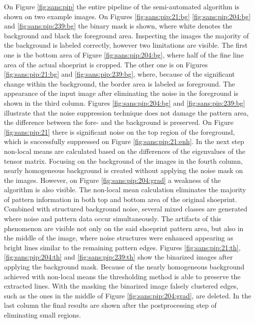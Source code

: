 \documentclass[draft,final]{vutinfth} %
\begin{document}
\par
On Figure \ref{fig:sans:pip} the entire pipeline of the semi-automated algorithm is shown on two example images.
On Figures  \ref{fig:sans:pip:21:bg} \ref{fig:sans:pip:204:bg} and \ref{fig:sans:pip:239:bg} the binary mask is shown, where white denotes the background and black the foreground area.
Inspecting the images the majority of the background is labeled correctly, however two limitations are visible.
The first one is the bottom area of Figure \ref{fig:sans:pip:204:bg}, where half of the fine line area of the actual shoeprint is cropped.
The other one is on Figures \ref{fig:sans:pip:21:bg} and \ref{fig:sans:pip:239:bg}, where, because of the significant change within the background, the border area is labeled as foreground.
The appearance of the input image after eliminating the noise in the foreground is shown in the third column.
Figures  \ref{fig:sans:pip:204:bg} and \ref{fig:sans:pip:239:bg} illustrate that the noise suppression technique does not damage the pattern area, the difference between the fore- and the background is preserved.
On Figure \ref{fig:sans:pip:21} there is significant noise on the top region of the foreground, which is successfully suppressed on Figure \ref{fig:sans:pip:21:enh}.
In the next step non-local means are calculated based on the differences of the eigenvalues of the tensor matrix.
Focusing on the background of the images in the fourth column, nearly homogeneous background is created without applying the noise mask on the images.
However, on Figure \ref{fig:sans:pip:204:grad} a weakness of the algorithm is also visible.
The non-local mean calculation eliminates the majority of pattern information in both top and bottom area of the original shoeprint.
Combined with structured background noise, several mixed classes are generated where noise and pattern data occur simultaneously.
The artifacts of this phenomenon are visible not only on the said shoeprint pattern area, but also in the middle of the image, where noise structures were enhanced appearing as bright lines similar to the remaining pattern edges.
Figures \ref{fig:sans:pip:21:th}, \ref{fig:sans:pip:204:th} and \ref{fig:sans:pip:239:th} show the binarized images after applying the background mask.
Because of the nearly homogeneous background achieved with non-local means the thresholding method is able to preserve the extracted lines.
With the masking the binarized image falsely clustered edges, such as the ones in the middle of Figure \ref{fig:sans:pip:204:grad}, are deleted.
In the last column the final results are shown after the postprocessing step of eliminating small regions.
\end{document}
